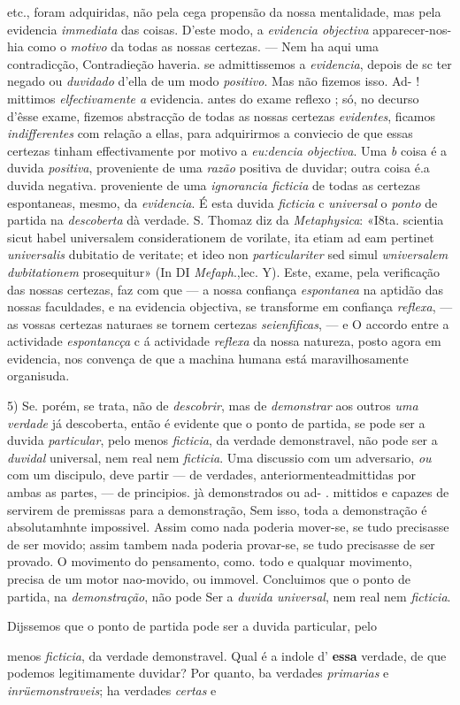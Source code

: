 etc., foram adquiridas, não pela cega propensão da nossa mentalidade, mas pela evidencia \emph{immediata} das coisas. D'este modo, a \emph{evidencia objectiva} apparecer-nos-hia como o \emph{motivo} da todas as nossas certezas. --- Nem ha aqui uma contradicção, Contradieção haveria. se admittissemos a \emph{evidencia}, depois de sc ter negado ou \emph{duvidado} d'ella de um modo \emph{positivo}. Mas não fizemos isso. Ad- ! mittimos \emph{elfectivamente a} evidencia. antes do exame reflexo ; só, no decurso d'êsse exame, fizemos abstracção de todas as nossas certezas \emph{evidentes}, ficamos \emph{indifferentes} com relação a ellas, para adquirirmos a conviecio de que essas certezas tinham effectivamente por motivo a \emph{eu:dencia objectiva}. Uma \emph{b} coisa é a duvida \emph{positiva}, proveniente de uma \emph{razão} positiva de duvidar; outra coisa é.a duvida negativa. proveniente de uma \emph{ignorancia ficticia} de todas as certezas espontaneas, mesmo, da \emph{evidencia}. É esta duvida \emph{ficticia} c \emph{universal} o \emph{ponto} de partida na \emph{descoberta} dà verdade. S. Thomaz diz da \emph{Metaphysica}: «I8ta. scientia sicut habel universalem considerationem de vorilate, ita etiam ad eam pertinet \emph{universalis} dubitatio de veritate; et ideo non \emph{particulariter} sed simul \emph{wniversalem dwbitationem} prosequitur» (In DI \emph{Mefaph}.,lec. Y). Este, exame, pela verificação das nossas certezas, faz com que --- a nossa confiança \emph{espontanea} na aptidão das nossas faculdades, e na evidencia objectiva, se transforme em confiança \emph{reflexa}, --- as vossas certezas naturaes se tornem certezas \emph{seienfificas}, --- e O accordo entre a actividade \emph{espontancça} c á actividade \emph{reflexa} da nossa natureza, posto agora em evidencia, nos convença de que a machina humana está maravilhosamente organisuda.\par 5) Se. porém, se trata, não de \emph{descobrir}, mas de \emph{demonstrar} aos outros \emph{uma verdade} já descoberta, então é evidente que o ponto de partida, se pode ser a duvida \emph{particular}, pelo menos \emph{ficticia}, da verdade demonstravel, não pode ser a \emph{duvidal} universal, nem real nem \emph{ficticia}. Uma discussio com um adversario, \emph{ou} com um discipulo, deve partir --- de verdades, anteriormenteadmittidas por ambas as partes, --- de principios. jà demonstrados ou ad- . mittidos e capazes de servirem de premissas para a demonstração, Sem isso, toda a demonstração é absolutamhnte impossivel. Assim como nada poderia mover-se, se tudo precisasse de ser movido; assim tambem nada poderia provar-se, se tudo precisasse de ser provado. O movimento do pensamento, como. todo e qualquar movimento, precisa de um motor nao-movido, ou immovel. Concluimos que o ponto de partida, na \emph{demonstração}, não pode Ser a \emph{duvida universal}, nem real nem \emph{ficticia}.\par Dijssemos que o ponto de partida pode ser a duvida particular, pelo\par menos \emph{ficticia}, da verdade demonstravel. Qual é a indole d' \textbf{essa} verdade, de que podemos legitimamente duvidar? Por quanto, ba verdades \emph{primarias} e \emph{inrüemonstraveis}; ha verdades \emph{certas} e 